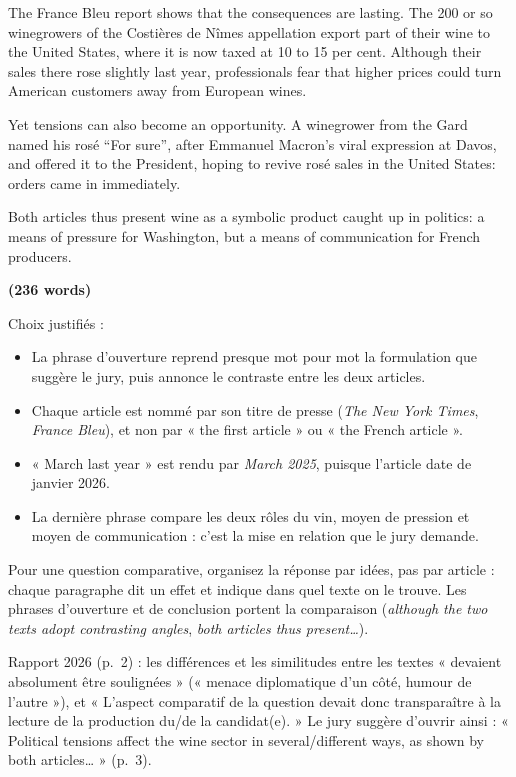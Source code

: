 \documentclass[11pt,a4paper]{article}
\providecommand{\tightlist}{\setlength{\itemsep}{0pt}\setlength{\parskip}{0pt}}
\begin{document}
The France Bleu report shows that the consequences are lasting. The 200 or so winegrowers of the Costières de Nîmes appellation export part of their wine to the United States, where it is now taxed at 10 to 15 per cent. Although their sales there rose slightly last year, professionals fear that higher prices could turn American customers away from European wines.

Yet tensions can also become an opportunity. A winegrower from the Gard named his rosé ``For sure'', after Emmanuel Macron's viral expression at Davos, and offered it to the President, hoping to revive rosé sales in the United States: orders came in immediately.

Both articles thus present wine as a symbolic product caught up in politics: a means of pressure for Washington, but a means of communication for French producers.

\textbf{(236 words)}

Choix justifiés :

\begin{itemize}
\tightlist
\item
  La phrase d'ouverture reprend presque mot pour mot la formulation que suggère le jury, puis annonce le contraste entre les deux articles.
\item
  Chaque article est nommé par son titre de presse (\emph{The New York Times}, \emph{France Bleu}), et non par « the first article » ou « the French article ».
\item
  « March last year » est rendu par \emph{March 2025}, puisque l'article date de janvier 2026.
\item
  La dernière phrase compare les deux rôles du vin, moyen de pression et moyen de communication : c'est la mise en relation que le jury demande.
\end{itemize}

\begin{methode}

Pour une question comparative, organisez la réponse par idées, pas par article : chaque paragraphe dit un effet et indique dans quel texte on le trouve. Les phrases d'ouverture et de conclusion portent la comparaison (\emph{although the two texts adopt contrasting angles}, \emph{both articles thus present\ldots{}}).

\end{methode}

\begin{jury}

Rapport 2026 (p.~2) : les différences et les similitudes entre les textes « devaient absolument être soulignées » (« menace diplomatique d'un côté, humour de l'autre »), et « L'aspect comparatif de la question devait donc transparaître à la lecture de la production du/de la candidat(e). » Le jury suggère d'ouvrir ainsi : « Political tensions affect the wine sector in several/different ways, as shown by both articles\ldots{} » (p.~3).

\end{jury}
\end{document}
